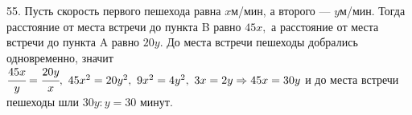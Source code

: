 55. Пусть скорость первого пешехода равна $x$м/мин, а второго --- $y$м/мин. Тогда расстояние от места встречи до пункта B равно $45x,$ а расстояние от места встречи до пункта A равно $20y.$ До места встречи пешеходы добрались одновременно, значит $\cfrac{45x}{y}=\cfrac{20y}{x},\ 45x^2=20y^2,\ 9x^2=4y^2,\ 3x=2y\Rightarrow45x=30y$ и до места встречи пешеходы шли $30y:y=30$ минут.\\
